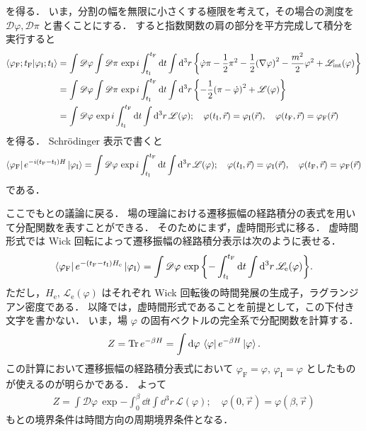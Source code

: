 \documentclass[dvipdfmx, a4paper]{jarticle}
\numberwithin{equation}{section}
\begin{document}
を得る．
いま，分割の幅を無限に小さくする極限を考えて，その場合の測度を $\mathscr{D}\varphi, \mathscr{D}\pi$ と書くことにする．
すると指数関数の肩の部分を平方完成して積分を実行すると
\begin{align}
  \bra{\varphi_\mathrm{F}; t_\mathrm{F}}\ket{\varphi_\mathrm{I}; t_\mathrm{I}}
  &= \int \mathscr{D}\varphi \int \mathscr{D}\pi \, \exp i\int_{t_\mathrm{I}}^{t_\mathrm{F}} \dd t \int \dd^3 r\, \qty{\dot{\varphi}\pi - \frac{1}{2}\pi^2 - \frac{1}{2}\qty(\nabla \varphi)^2 - \frac{m^2}{2}\varphi^2 + \mathscr{L}_\mathrm{int}(\varphi)} \notag\\
  &= \int \mathscr{D}\varphi \int \mathscr{D}\pi \, \exp i\int_{t_\mathrm{I}}^{t_\mathrm{F}} \dd t \int \dd^3 r\, \qty{-\frac{1}{2}\qty(\pi - \dot{\varphi})^2 + \mathscr{L}(\varphi)} \notag\\
  &= \int \mathscr{D}\varphi \, \exp i\int_{t_\mathrm{I}}^{t_\mathrm{F}} \dd t \int \dd^3r \, \mathscr{L}(\varphi);\quad
  \varphi(t_\mathrm{I}, \vec{r}) = \varphi_\mathrm{I}(\vec{r}), \quad \varphi(t_\mathrm{F}, \vec{r}) = \varphi_\mathrm{F}(\vec{r})
\end{align}
を得る．
Schrödinger 表示で書くと
\begin{align}
  \bra{\varphi_\mathrm{F}} e^{-i(t_\mathrm{F} - t_\mathrm{I})H}\ket{\varphi_\mathrm{I}} = \int \mathscr{D}\varphi \, \exp i\int_{t_\mathrm{I}}^{t_\mathrm{F}} \dd t \int \dd^3r \, \mathscr{L}(\varphi); \quad
  \varphi(t_\mathrm{I}, \vec{r}) = \varphi_\mathrm{I}(\vec{r}), \quad \varphi(t_\mathrm{F}, \vec{r}) = \varphi_\mathrm{F}(\vec{r})
\end{align}
である．

ここでもとの議論に戻る．
場の理論における遷移振幅の経路積分の表式を用いて分配関数を表すことができる．
そのためにまず，虚時間形式に移る．
虚時間形式では Wick 回転によって遷移振幅の経路積分表示は次のように表せる．
\begin{align}
  \bra{\varphi_\mathrm{F}}e^{-(t_\mathrm{F}- t_\mathrm{I})H_\mathrm{e}} \ket{\varphi_\mathrm{I}} = \int \mathscr{D}\varphi \, \exp \qty{-\int_{t_\mathrm{I}}^{t_\mathrm{F}} \dd t \int \dd^3r \, \mathscr{L}_\mathrm{e}(\varphi)}.
\end{align}
ただし，$H_\mathrm{e}, \, \mathscr{L}_\mathrm{e}(\varphi)$ はそれぞれ Wick 回転後の時間発展の生成子，ラグランジアン密度である．
以降では，虚時間形式であることを前提として，この下付き文字を書かない．
いま，場 $\varphi$ の固有ベクトルの完全系で分配関数を計算する．
\begin{align}
  Z = \Tr e^{-\beta H} = \int \dd \varphi \, \bra{\varphi} e^{-\beta H}\ket{\varphi}.
\end{align}
この計算において遷移振幅の経路積分表式において $\varphi_\mathrm{F} = \varphi, \, \varphi_\mathrm{I} = \varphi$ としたものが使えるのが明らかである．
よって
\begin{align}
  Z = \int \mathscr{D} \varphi \, \exp{-\int_0^\beta \dd t \int \dd^3 r \, \mathscr{L}(\varphi)} ; \quad \varphi(0, \vec{r}) = \varphi(\beta, \vec{r})
\end{align}
もとの境界条件は時間方向の周期境界条件となる．
\end{document}

